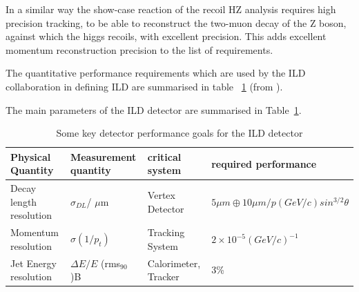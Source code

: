 \documentclass[%
 amsmath,amssymb,
 aps,
]{revtex4-1}
\renewcommand{\toprule}{\hline}
\newcommand{\midrule}{\hline}
\newcommand{\bottomrule}{\hline}
\begin{document}
In a similar way the show-case reaction of the recoil HZ analysis requires high precision tracking, to be able to reconstruct the two-muon decay of the Z boson, against which the higgs recoils, with excellent precision. This adds excellent momentum reconstruction precision to the list of requirements. 

The quantitative performance requirements which are used by the ILD collaboration in defining ILD are summarised in table~
\ref{ild:tab:barrelpara} (from \cite{Behnke:2013lya}).

The main parameters of the ILD detector are summarised in Table~\ref{ild:tab:barrelpara}.

\begin{table}\small
\begin{center}
    \begin{tabular}{|l |l|l|l|}
\toprule
Physical Quantity & Measurement quantity & critical system & required performance\\
\midrule
Decay length resolution & $\sigma_{DL}$/ $\mu$m  & Vertex Detector & $ 5 \mu m \oplus 10 \mu m / p(GeV/c)sin^{3/2}\theta$ \\
\midrule
Momentum resolution  & $\sigma(1/p_t)$ &  Tracking System &$2 \times 10^{-5} (GeV/c)^{-1}$ \\
\midrule
Jet Energy resolution & $\Delta E/ E $ (rms$_{90}$)B & Calorimeter, Tracker & 3\% \\
\bottomrule
\end{tabular}
\end{center}
\caption{Some key detector performance goals for the ILD detector}
\label{ild:tab:barrelpara}
\end{table}
\end{document}
